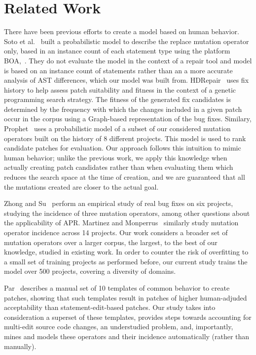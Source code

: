 \documentclass[conference]{IEEEtran}
\begin{document}
\section{Related Work} \label{relatedWork}

There have been previous efforts to create a model based on human behavior.  Soto et al.~\cite{Soto16} 
built a probabilistic model to describe the replace mutation 
operator only, based in 
an instance count of each statement type using the platform 
BOA,~\cite{dyer2013}.  They do not evaluate the model in the context of a repair
tool and model is based on an instance count of statements rather than an a more accurate analysis of AST differences, which our model was built from.  
HDRepair~\cite{xuan16} 
uses fix history
to help assess patch suitability and fitness in the context of a genetic
programming search strategy. The fitness of the generated
fix candidates is determined by the frequency with which the changes included in
a given patch occur in the corpus using a Graph-based representation of the bug
fixes.  Similary, Prophet~\cite{long16proph} uses a
probabilistic model of a subset of our considered mutation operators built on 
the history of 8 different projects. This model is used to rank candidate
patches for evaluation.  Our approach follows this intuition to mimic human
behavior; unlike the previous work, we apply this knowledge when actually
creating patch candidates rather than when evaluating them which reduces the search space at the time of creation, and we are guaranteed that all the mutations created are closer to the actual goal.  

Zhong and Su~\cite{zhong15} perform an empirical study of
real bug fixes on six projects, studying the incidence of three mutation
operators, among other questions about the applicability of APR.  Martinez and
Monperrus~\cite{martinez15} similarly study mutation operator incidence across 14 
projects. Our work considers a broader set of
mutation operators over a larger corpus, the largest, to the best of our
knowledge, studied in existing work. In 
order to counter the 
risk of overfitting to a small set of training projects as performed before, our 
current study trains the model over 500 projects, covering a diversity 
of domains.

Par~\cite{kim2013} describes a manual set of 10 templates of common behavior to
create patches, showing that such templates result in patches of higher
human-adjuded acceptability than statement-edit-based patches.  Our study takes into consideration a superset
of these templates, provides steps towards
accounting for multi-edit source code changes, an understudied problem, and,
importantly, mines and models these operators and their incidence automatically
(rather than manually).
\end{document}
